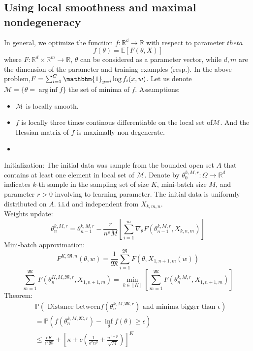 \documentclass{article}
\DeclareMathOperator*{\arginf}{arg\,inf}
\theoremstyle{theorem}
\theoremstyle{definition}
\begin{document}
	\subsection{Using local smoothness and maximal nondegeneracy}
	In general, we optimize the function $f: \mathbb{R^d} \to \mathbb{R}$ with respect to parameter $theta$ $$f(\theta)=\mathbb{E}[F(\theta,X)]$$ where $F: \mathbb{R}^d \times \mathbb{R}^m \to \mathbb{R}$, $\theta$ can be considered as a parameter vector, while $d,m$ are the dimension of the parameter and training examples (resp.). In the above problem,$F = \sum_{i=1}^C \mathbbm{1}_{y=i} \log  f_i(x,w)$. Let us denote $\mathcal{M} = \{\theta = \arginf f\}$ the set of minima of $f$.
	Assumptions:
	\begin{itemize}
		\item $\mathcal{M}$ is locally smooth.
		\item $f$ is locally three times continous differentiable on the local set of$\mathcal{M}$. And the Hessian matrix of $f$ is maximally non degenerate.
		\item 
	\end{itemize}
Initialization:
The initial data was sample from the bounded open set $A$ that contains at least one element in local set of $\mathcal{M}$.
Denote by $\theta_{0}^{k,M,r} : \Omega \to \mathbb{R}^d$ indicates $k$-th sample in the sampling set of size $K$, mini-batch size $M$, and parameter $r>0$ involving to learning parameter. The initial data is uniformly distributed on $A$. i.i.d and independent from $X_{k,m,n}$.\\
Weights update: $$\theta_{n}^{k,M,r}  =\theta_{n-1}^{k,M,r} -\frac{r}{n^{\rho} M} \left[\sum_{i=1}^{m} \nabla_{\theta}F(\theta_{n-1}^{k,M,r} , X_{k,n,m}) \right] $$
Mini-batch approximation:
$$F^{K, \mathfrak{M},n }(\theta , w)= \frac{1}{\mathfrak{M}} \sum_{i=1}^{\mathfrak{M}}  F \left( \theta,  X_{1,n+1,m} (w)\right)$$
$$\sum_{m=1}^{\mathfrak{M}}F \left(\theta_{n}^{K,M,\mathfrak{M},r} , X_{1,n+1,m}\right) =\min_{k \in [K]} \left[\sum_{m=1}^{\mathfrak{M}}F \left(\theta_{n}^{k,M,r} , X_{1,n+1,m}\right) \right]$$ 
Theorem: $$\begin{aligned}
&\mathbb{P}\left( \text{ Distance between} f(\theta_{n}^{k,M,\mathfrak{M},r}) \text{ and minima bigger than }\epsilon \right) \\ &= \mathbb{P}\left(  f(\theta_{n}^{k,M,\mathfrak{M},r}) - \inf_{\theta} f(\theta)\geq \epsilon \right) \\ &\leq \frac{cK}{\epsilon^2 \mathfrak{M}} + \left[ \kappa + c \left(\frac{1}{\epsilon^2 n ^{\rho}}+ \frac{n^{1-p}}{\sqrt{M}}\right)\right]^K \end{aligned}$$
\end{document}
